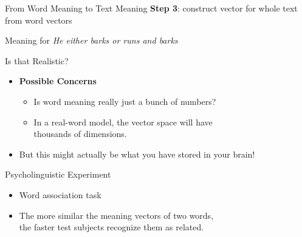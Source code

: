 \documentclass[professionalfonts, xcolor={usenames,svgnames,x11names,table}]{beamer}
\begin{document}
\begin{frame}{From Word Meaning to Text Meaning}
    \textbf{Step 3}: construct vector for whole text from word vectors

    \begin{exampleblock}{Meaning for \emph{He either barks or runs and barks}}
        \centering
    \end{exampleblock}
\end{frame}

\begin{frame}{Is that Realistic?}
    \begin{itemize}
        \item \textbf{Possible Concerns}
            \begin{itemize}
                \item Is word meaning really just a bunch of numbers?
                \item In a real-word model, the vector space will have\\
                    thousands of dimensions.
            \end{itemize}
        \item But this might actually be what you have stored in your brain!
    \end{itemize}
    \begin{block}{Psycholinguistic Experiment}
        \begin{itemize}
            \item Word association task
            \item The more similar the meaning vectors of two words,\\
                the faster test subjects recognize them as related.
        \end{itemize}
    \end{block}
\end{frame}
\end{document}
